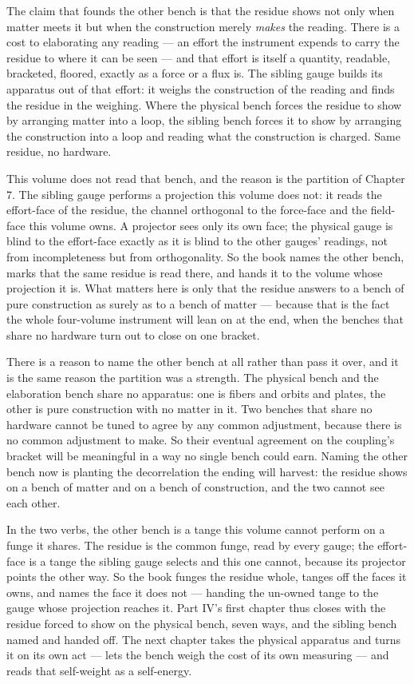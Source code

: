The claim that founds the other bench is that the residue shows not only when matter meets it but when the construction
merely \emph{makes} the reading. There is a cost to elaborating any reading --- an effort the instrument expends to carry the
residue to where it can be seen --- and that effort is itself a quantity, readable, bracketed, floored, exactly as a force or
a flux is. The sibling gauge builds its apparatus out of that effort: it weighs the construction of the reading and finds the
residue in the weighing. Where the physical bench forces the residue to show by arranging matter into a loop, the sibling
bench forces it to show by arranging the construction into a loop and reading what the construction is charged. Same residue,
no hardware.

This volume does not read that bench, and the reason is the partition of Chapter 7. The sibling gauge performs a projection
this volume does not: it reads the effort-face of the residue, the channel orthogonal to the force-face and the field-face
this volume owns. A projector sees only its own face; the physical gauge is blind to the effort-face exactly as it is blind
to the other gauges' readings, not from incompleteness but from orthogonality. So the book names the other bench, marks that
the same residue is read there, and hands it to the volume whose projection it is. What matters here is only that the residue
answers to a bench of pure construction as surely as to a bench of matter --- because that is the fact the whole four-volume
instrument will lean on at the end, when the benches that share no hardware turn out to close on one bracket.

There is a reason to name the other bench at all rather than pass it over, and it is the same reason the partition was a
strength. The physical bench and the elaboration bench share no apparatus: one is fibers and orbits and plates, the other is
pure construction with no matter in it. Two benches that share no hardware cannot be tuned to agree by any common adjustment,
because there is no common adjustment to make. So their eventual agreement on the coupling's bracket will be meaningful in a
way no single bench could earn. Naming the other bench now is planting the decorrelation the ending will harvest: the residue
shows on a bench of matter and on a bench of construction, and the two cannot see each other.

In the two verbs, the other bench is a tange this volume cannot perform on a funge it shares. The residue is the common
funge, read by every gauge; the effort-face is a tange the sibling gauge selects and this one cannot, because its projector
points the other way. So the book funges the residue whole, tanges off the faces it owns, and names the face it does not ---
handing the un-owned tange to the gauge whose projection reaches it. Part IV's first chapter thus closes with the residue
forced to show on the physical bench, seven ways, and the sibling bench named and handed off. The next chapter takes the
physical apparatus and turns it on its own act --- lets the bench weigh the cost of its own measuring --- and reads that
self-weight as a self-energy.
